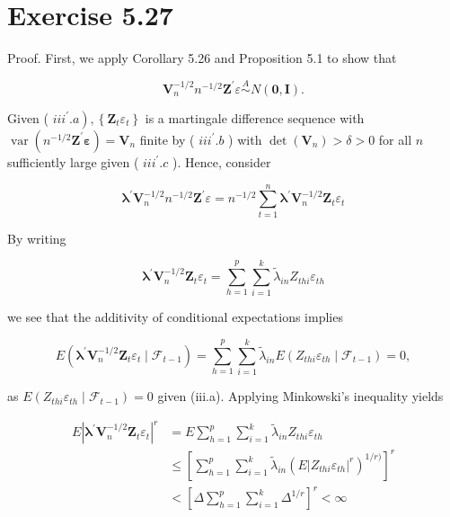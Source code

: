 \documentclass[10pt]{article}
\begin{document}
\section*{Exercise 5.27}
Proof. First, we apply Corollary 5.26 and Proposition 5.1 to show that

$$
\mathbf{V}_{n}^{-1 / 2} n^{-1 / 2} \mathbf{Z}^{\prime} \varepsilon \stackrel{A}{\sim} N(\mathbf{0}, \mathbf{I}) .
$$

Given ( $\left.i i i^{\prime} . a\right),\left\{\mathbf{Z}_{t} \varepsilon_{t}\right\}$ is a martingale difference sequence with $\operatorname{var}\left(n^{-1 / 2} \mathbf{Z}^{\prime} \boldsymbol{\varepsilon}\right) =\mathbf{V}_{n}$ finite by ( $i i i^{\prime} . b$ ) with $\operatorname{det}\left(\mathbf{V}_{n}\right)>\delta>0$ for all $n$ sufficiently large given ( $i i i^{\prime} . c$ ). Hence, consider

$$
\boldsymbol{\lambda}^{\prime} \mathbf{V}_{n}^{-1 / 2} n^{-1 / 2} \mathbf{Z}^{\prime} \varepsilon=n^{-1 / 2} \sum_{t=1}^{n} \boldsymbol{\lambda}^{\prime} \mathbf{V}_{n}^{-1 / 2} \mathbf{Z}_{t} \varepsilon_{t}
$$

By writing

$$
\boldsymbol{\lambda}^{\prime} \mathbf{V}_{n}^{-1 / 2} \mathbf{Z}_{t} \varepsilon_{t}=\sum_{h=1}^{p} \sum_{i=1}^{k} \tilde{\lambda}_{i n} Z_{t h i} \varepsilon_{t h}
$$

we see that the additivity of conditional expectations implies

$$
E\left(\boldsymbol{\lambda}^{\prime} \mathbf{V}_{n}^{-1 / 2} \mathbf{Z}_{t} \varepsilon_{t} \mid \mathcal{F}_{t-1}\right)=\sum_{h=1}^{p} \sum_{i=1}^{k} \tilde{\lambda}_{i n} E\left(Z_{t h i} \varepsilon_{t h} \mid \mathcal{F}_{t-1}\right)=0,
$$

as $E\left(Z_{t h i} \varepsilon_{t h} \mid \mathcal{F}_{t-1}\right)=0$ given (iii.a). Applying Minkowski's inequality yields

$$
\begin{aligned}
E\left|\boldsymbol{\lambda}^{\prime} \mathbf{V}_{n}^{-1 / 2} \mathbf{Z}_{t} \varepsilon_{t}\right|^{r} & =E \sum_{h=1}^{p} \sum_{i=1}^{k} \tilde{\lambda}_{i n} Z_{t h i} \varepsilon_{t h} \\
& \leq\left[\sum_{h=1}^{p} \sum_{i=1}^{k} \tilde{\lambda}_{i n}\left(E\left|Z_{t h i} \varepsilon_{t h}\right|^{r}\right)^{1 / r)}\right]^{r} \\
& <\left[\Delta \sum_{h=1}^{p} \sum_{i=1}^{k} \Delta^{1 / r}\right]^{r}<\infty
\end{aligned}
$$
\end{document}
